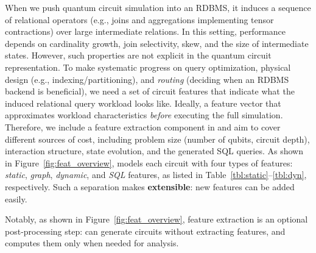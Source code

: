 When we push quantum circuit simulation into an RDBMS, it induces a sequence of
relational operators (e.g., joins and aggregations implementing tensor
contractions) over large intermediate relations. In this setting, performance
depends on cardinality growth, join selectivity, skew, and the size of
intermediate states. However, such properties are not explicit in the quantum 
circuit representation. 
%
To make systematic progress on query optimization,
physical design (e.g., indexing/partitioning), and \emph{routing} (deciding when
an RDBMS backend is beneficial), we need a set of circuit features that
indicate what the induced relational query workload looks like. Ideally, a
feature vector that approximates workload characteristics \emph{before}
executing the full simulation.
Therefore, we include a feature extraction component in \sys and aim to cover
different sources of cost, including problem size (number of qubits, circuit
depth), interaction structure,  state evolution, and the generated SQL queries. 
As shown in Figure~\ref{fig:feat_overview}, \sys models each circuit with four types
of features: \emph{static}, \emph{graph}, \emph{dynamic}, and \emph{SQL} features, as listed in Table~\ref{tbl:static}--\ref{tbl:dyn}, respectively. Such a
separation makes \sys \textbf{extensible}: new features can be added easily.  

Notably, as shown in Figure~\ref{fig:feat_overview},
feature extraction is an optional post-processing step: \sys can generate circuits
without extracting features, and computes them only when needed for analysis. 


